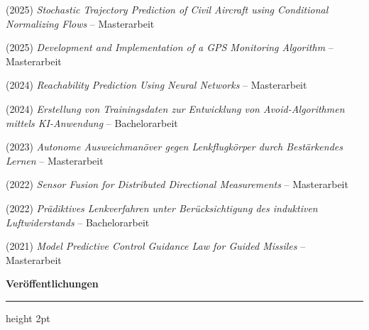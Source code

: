 \documentclass[11pt,a4paper]{article}
\newcommand{\sectiontitle}[1]{%
    \vspace{6pt}
    {\Large\bfseries\color{darkblue}#1}
    \nopagebreak
    \vspace{3pt}
    {\color{accentgreen}\hrule height 2pt}
    \vspace{4pt}
}
\begin{document}
\begin{enumerate}[label=\textbf{[\arabic*]}, leftmargin=0.8cm, itemsep=3pt]
    \item (2025) \textit{Stochastic Trajectory Prediction of Civil Aircraft using Conditional Normalizing Flows} -- Masterarbeit
    \item (2025) \textit{Development and Implementation of a GPS Monitoring Algorithm} -- Masterarbeit
    \item (2024) \textit{Reachability Prediction Using Neural Networks} -- Masterarbeit
    \item (2024) \textit{Erstellung von Trainingsdaten zur Entwicklung von Avoid-Algorithmen mittels KI-Anwendung} -- Bachelorarbeit
    \item (2023) \textit{Autonome Ausweichmanöver gegen Lenkflugkörper durch Bestärkendes Lernen} -- Masterarbeit
    \item (2022) \textit{Sensor Fusion for Distributed Directional Measurements} -- Masterarbeit
    \item (2022) \textit{Prädiktives Lenkverfahren unter Berücksichtigung des induktiven Luftwiderstands} -- Bachelorarbeit
    \item (2021) \textit{Model Predictive Control Guidance Law for Guided Missiles} -- Masterarbeit
\end{enumerate}

\vspace{15pt}



\newpage
\sectiontitle{Veröffentlichungen}
\end{document}
